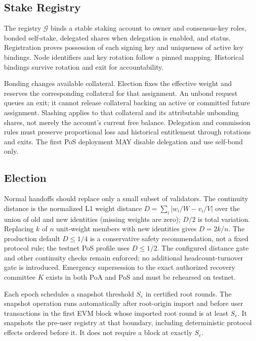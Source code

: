 \subsection{Stake Registry}

The registry $\mathcal{G}$ binds a stable staking account to owner and consensus-key roles, bonded self-stake, delegated shares when delegation is enabled, and status. Registration proves possession of each signing key and uniqueness of active key bindings. Node identifiers and key rotation follow a pinned mapping. Historical bindings survive rotation and exit for accountability.

Bonding changes available collateral. Election fixes the effective weight and reserves the corresponding collateral for that assignment. An unbond request queues an exit; it cannot release collateral backing an active or committed future assignment. Slashing applies to that collateral and its attributable unbonding shares, not merely the account's current free balance. Delegation and commission rules must preserve proportional loss and historical entitlement through rotations and exits. The first PoS deployment MAY disable delegation and use self-bond only.

\subsection{Election}\label{sec:gov-election}

Normal handoffs should replace only a small subset of validators. The continuity distance is the normalized L1 weight distance $D=\sum_i |w_i/W-v_i/V|$ over the union of old and new identities (missing weights are zero); $D/2$ is total variation. Replacing $k$ of $n$ unit-weight members with new identities gives $D=2k/n$. The production default $D\leq1/4$ is a conservative safety recommendation, not a fixed protocol rule; the testnet PoS profile uses $D\leq1/2$. The configured distance gate and other continuity checks remain enforced; no additional headcount-turnover gate is introduced. Emergency supersession to the exact authorized recovery committee $K$ exists in both PoA and PoS and must be rehearsed on testnet.

Each epoch schedules a snapshot threshold $S_e$ in certified root rounds. The snapshot operation runs automatically after root-origin import and before user transactions in the first EVM block whose imported root round is at least $S_e$. It snapshots the pre-user registry at that boundary, including deterministic protocol effects ordered before it. It does not require a block at exactly $S_e$.

